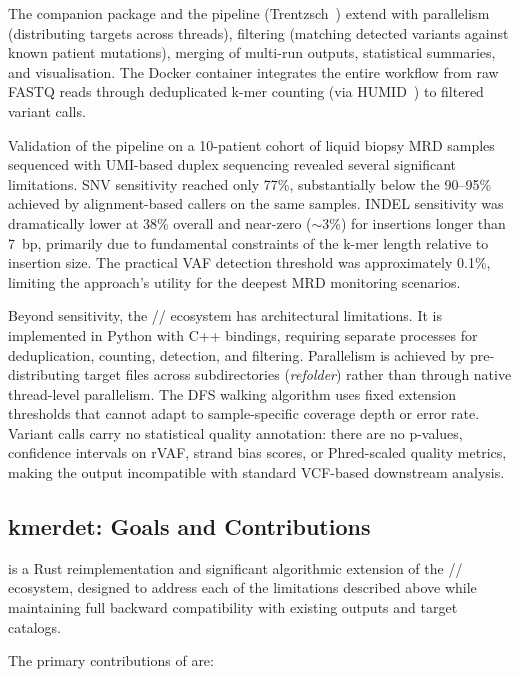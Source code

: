 The \kmtools{} companion package and the \kam{} pipeline
(Trentzsch~\cite{kamtool}) extend \km{} with parallelism (distributing targets
across threads), filtering (matching detected variants against known patient
mutations), merging of multi-run outputs, statistical summaries, and
visualisation.  The \kam{} Docker container integrates the entire workflow from
raw FASTQ reads through deduplicated k-mer counting (via HUMID~\cite{pockrandt2020humid})
to filtered variant calls.

Validation of the \kam{} pipeline on a 10-patient cohort of liquid biopsy MRD
samples sequenced with UMI-based duplex sequencing revealed several significant
limitations.  SNV sensitivity reached only 77\%, substantially below the
90--95\% achieved by alignment-based callers on the same samples.  INDEL
sensitivity was dramatically lower at 38\% overall and near-zero ($\sim$3\%) for
insertions longer than 7~bp, primarily due to fundamental constraints of the
k-mer length relative to insertion size.  The practical VAF detection threshold
was approximately 0.1\%, limiting the approach's utility for the deepest MRD
monitoring scenarios.

Beyond sensitivity, the \km{}/\kmtools{}/\kam{} ecosystem has architectural
limitations.  It is implemented in Python with C++ \jf{} bindings, requiring
separate processes for deduplication, counting, detection, and filtering.
Parallelism is achieved by pre-distributing target files across subdirectories
(\textit{refolder}) rather than through native thread-level parallelism.  The
DFS walking algorithm uses fixed extension thresholds that cannot adapt to
sample-specific coverage depth or error rate.  Variant calls carry no
statistical quality annotation: there are no p-values, confidence intervals on
rVAF, strand bias scores, or Phred-scaled quality metrics, making the output
incompatible with standard VCF-based downstream analysis.

\subsection{kmerdet: Goals and Contributions}

\kmerdet{} is a Rust reimplementation and significant algorithmic extension of
the \km{}/\kmtools{}/\kam{} ecosystem, designed to address each of the
limitations described above while maintaining full backward compatibility with
existing \km{} outputs and target catalogs.

The primary contributions of \kmerdet{} are:

